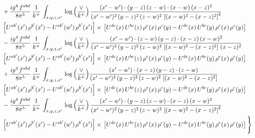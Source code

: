 \documentclass[10pt]{article}
\numberwithin{equation}{section}
\begin{document}
\begin{align}
& +\frac{ig^{4}\, f^{abd}}{8\pi^{5}}\, \frac{1}{k^{+}}\, \int_{x,y,z,x'}\,\log{\left(\frac{\vee}{k^{+}}\right)}\,\frac{(x'-w')\cdot  (y-z)\, (z-w)\cdot (x-w)\, (x-z)^{2}}{(x'-w')^{2}\, (y-z)^{2}\, (z-w)^{2}\,\left[(x-w)^{2}-(x-z)^{2}\right]^{2}}\, \notag \\ & \left[U^{ab'}(x')\,\rho^{b'}(x')-U^{ab'}(w')\, \rho^{b'}(x')\right]\times\,\left[U^{de}(x)\,U^{bc}(z)\, \rho^{e}(x)\,\rho^{c}(y)-U^{de}(x)\,U^{bc}(y)\,\rho^{e}(x)\,\rho^{c}(y)\right] \notag \\
& - \frac{ig^{4}\, f^{abd}}{8\pi^{5}}\, \frac{1}{k^{+}}\, \int_{x,y,z,x'}\,\log{\left(\frac{\vee}{k^{+}}\right)}\,\frac{(x'-w')\cdot (z-w)\, (y-z)\cdot (x-z)\, (x-w)^{2}}{(x'-w')^{2}\, (y-z)^{2}\, (z-w)^{2}\,\left[(x-w)^{2} - (x-z)^{2}\right]\, (x-z)^{2}}\, \notag \\ & \left[U^{ab'}(x')\,\rho^{b'}(x')-U^{ab'}(w')\, \rho^{b'}(x')\right]\times\,\left[U^{de}(x)\,U^{bc}(z)\, \rho^{e}(x)\,\rho^{c}(y)-U^{de}(x)\,U^{bc}(y)\,\rho^{e}(x)\,\rho^{c}(y)\right] \notag \\
& +\frac{ig^{4}\, f^{abd}}{8\pi^{5}}\, \frac{1}{k^{+}}\, \int_{x,y,z,x'}\,\log{\left(\frac{\vee}{k^{+}}\right)}\frac{(x'-w')\cdot (x-z)\, (y-z)\cdot (z-w)}{(x'-w')^{2}\, (y-z)^{2}\, (z-w)^{2}\,\left[(x-w)^{2} -(x-z)^{2}\right]}\, \notag \\ & \left[U^{ab'}(x')\,\rho^{b'}(x')-U^{ab'}(w')\, \rho^{b'}(x')\right]\times\,\left[U^{de}(x)\,U^{bc}(z)\, \rho^{e}(x)\,\rho^{c}(y)-U^{de}(x)\,U^{bc}(y)\,\rho^{e}(x)\,\rho^{c}(y)\right] \notag \\
& -\frac{ig^{4}\, f^{abd}}{8\pi^{5}}\, \frac{1}{k^{+}}\, \int_{x,y,z,x'}\,\log{\left(\frac{\vee}{k^{+}}\right)}\,\frac{(x'-w')\cdot (y-z)\, (z-w)\cdot (x-z)\,(x-w)^{2}}{(x'-w')^{2}\, (y-z)^{2}\, (z-w)^{2}\,\left[(x-w)^{2}-(x-z)^{2}\right]^{2}}\, \notag \\ & \left[U^{ab'}(x')\,\rho^{b'}(x')-U^{ab'}(w')\, \rho^{b'}(x')\right]\times\,\left[U^{de}(x)\,U^{bc}(z)\, \rho^{e}(x)\,\rho^{c}(y)-U^{de}(x)\,U^{bc}(y)\,\rho^{e}(x)\,\rho^{c}(y)\right]\Bigg\} \label{eq:B:G1IIIN2}
\end{align}
\end{document}

